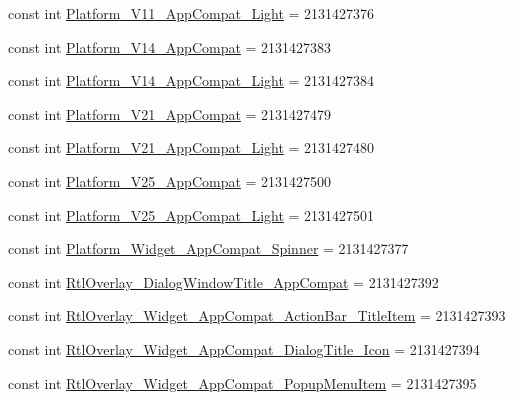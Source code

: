 \begin{DoxyCompactItemize}
const int \mbox{\hyperlink{class_f_w_p_s___app_1_1_droid_1_1_resource_1_1_style_a33d8f02fb14bb7fa04bfea273f271b32}{Platform\+\_\+\+V11\+\_\+\+App\+Compat\+\_\+\+Light}} = 2131427376
\item 
const int \mbox{\hyperlink{class_f_w_p_s___app_1_1_droid_1_1_resource_1_1_style_adc3f4e7dada6b1396d4c90b0fe9921f4}{Platform\+\_\+\+V14\+\_\+\+App\+Compat}} = 2131427383
\item 
const int \mbox{\hyperlink{class_f_w_p_s___app_1_1_droid_1_1_resource_1_1_style_ac9cccc5e2333326d186c1443bf43baa6}{Platform\+\_\+\+V14\+\_\+\+App\+Compat\+\_\+\+Light}} = 2131427384
\item 
const int \mbox{\hyperlink{class_f_w_p_s___app_1_1_droid_1_1_resource_1_1_style_a30f532a69bf9d87cc2712910949a93e9}{Platform\+\_\+\+V21\+\_\+\+App\+Compat}} = 2131427479
\item 
const int \mbox{\hyperlink{class_f_w_p_s___app_1_1_droid_1_1_resource_1_1_style_af32615088753fd696cb692b10a707dfd}{Platform\+\_\+\+V21\+\_\+\+App\+Compat\+\_\+\+Light}} = 2131427480
\item 
const int \mbox{\hyperlink{class_f_w_p_s___app_1_1_droid_1_1_resource_1_1_style_a8604c7df0c67de20925c0865fe5f8fea}{Platform\+\_\+\+V25\+\_\+\+App\+Compat}} = 2131427500
\item 
const int \mbox{\hyperlink{class_f_w_p_s___app_1_1_droid_1_1_resource_1_1_style_a5784e530abede97fee614b0b7f9aeab1}{Platform\+\_\+\+V25\+\_\+\+App\+Compat\+\_\+\+Light}} = 2131427501
\item 
const int \mbox{\hyperlink{class_f_w_p_s___app_1_1_droid_1_1_resource_1_1_style_a3820655ee649b1751580d1ad3c780992}{Platform\+\_\+\+Widget\+\_\+\+App\+Compat\+\_\+\+Spinner}} = 2131427377
\item 
const int \mbox{\hyperlink{class_f_w_p_s___app_1_1_droid_1_1_resource_1_1_style_a086bd49ea381b493303782aac2e7889d}{Rtl\+Overlay\+\_\+\+Dialog\+Window\+Title\+\_\+\+App\+Compat}} = 2131427392
\item 
const int \mbox{\hyperlink{class_f_w_p_s___app_1_1_droid_1_1_resource_1_1_style_ac71a09305dbe4f6608087db0fb82bc67}{Rtl\+Overlay\+\_\+\+Widget\+\_\+\+App\+Compat\+\_\+\+Action\+Bar\+\_\+\+Title\+Item}} = 2131427393
\item 
const int \mbox{\hyperlink{class_f_w_p_s___app_1_1_droid_1_1_resource_1_1_style_a0cbfc745b258a132cfefbe7ad321b614}{Rtl\+Overlay\+\_\+\+Widget\+\_\+\+App\+Compat\+\_\+\+Dialog\+Title\+\_\+\+Icon}} = 2131427394
\item 
const int \mbox{\hyperlink{class_f_w_p_s___app_1_1_droid_1_1_resource_1_1_style_a32f72277935000114f08b106e3e5df8e}{Rtl\+Overlay\+\_\+\+Widget\+\_\+\+App\+Compat\+\_\+\+Popup\+Menu\+Item}} = 2131427395

\end{DoxyCompactItemize}
